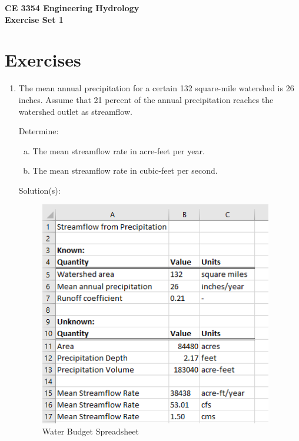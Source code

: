 \documentclass[12pt]{article}
\begin{document}
\begin{center}
{\textbf{{ CE 3354 Engineering Hydrology} \\ {Exercise Set 1}}}
\end{center}

\section*{\small{Exercises}}
\begin{enumerate}
\item The mean annual precipitation for a certain 132 square-mile watershed is 26 inches. Assume that 21 percent of the annual precipitation reaches the watershed outlet as streamflow.

Determine:
    \begin{enumerate}[a)]
        \item The mean streamflow rate in acre-feet per year. 
        \item The mean streamflow rate in cubic-feet per second.
    \end{enumerate}
    
Solution(s):
\begin{figure}[h!] %
   \centering
   \includegraphics[width=4in]{ES1-P1-XLS.png} 
   \caption{Water Budget Spreadsheet}
   \label{fig:ES1-P1-XLS}
\end{figure}


\end{enumerate}
\end{document}
